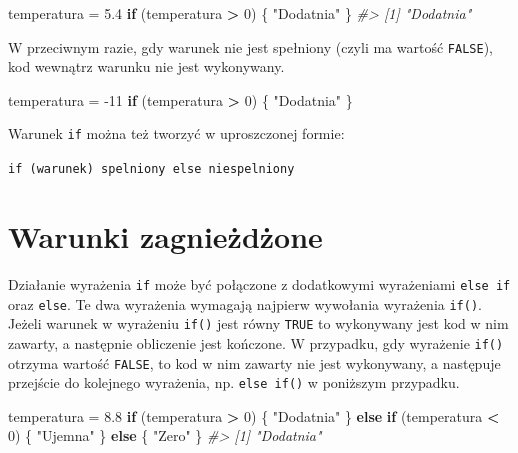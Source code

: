 \documentclass[paper=6in:9in,pagesize=pdftex,headinclude=on,footinclude=on,10pt]{scrbook}
\newenvironment{Shaded}{\begin{snugshade}}{\end{snugshade}}
\newcommand{\CommentTok}[1]{\textcolor[rgb]{0.56,0.35,0.01}{\textit{#1}}}
\newcommand{\ControlFlowTok}[1]{\textcolor[rgb]{0.13,0.29,0.53}{\textbf{#1}}}
\newcommand{\DecValTok}[1]{\textcolor[rgb]{0.00,0.00,0.81}{#1}}
\newcommand{\FloatTok}[1]{\textcolor[rgb]{0.00,0.00,0.81}{#1}}
\newcommand{\NormalTok}[1]{#1}
\newcommand{\OperatorTok}[1]{\textcolor[rgb]{0.81,0.36,0.00}{\textbf{#1}}}
\newcommand{\StringTok}[1]{\textcolor[rgb]{0.31,0.60,0.02}{#1}}
\let\BeginKnitrBlock\begin \let\EndKnitrBlock\end
\begin{document}
\begin{Shaded}
\begin{Highlighting}[]
\NormalTok{temperatura =}\StringTok{ }\FloatTok{5.4}
\ControlFlowTok{if}\NormalTok{ (temperatura }\OperatorTok{>}\StringTok{ }\DecValTok{0}\NormalTok{) \{}
  \StringTok{"Dodatnia"}
\NormalTok{\}}
\CommentTok{#> [1] "Dodatnia"}
\end{Highlighting}
\end{Shaded}

W przeciwnym razie, gdy warunek nie jest spełniony (czyli ma wartość \texttt{FALSE}), kod wewnątrz warunku nie jest wykonywany.

\begin{Shaded}
\begin{Highlighting}[]
\NormalTok{temperatura =}\StringTok{ }\DecValTok{-11}
\ControlFlowTok{if}\NormalTok{ (temperatura }\OperatorTok{>}\StringTok{ }\DecValTok{0}\NormalTok{) \{}
  \StringTok{"Dodatnia"}
\NormalTok{\}}
\end{Highlighting}
\end{Shaded}

\BeginKnitrBlock{rmdinfo}
Warunek \texttt{if} można też tworzyć w uproszczonej formie:

\texttt{if\ (warunek)\ spelniony\ else\ niespelniony}
\EndKnitrBlock{rmdinfo}

\hypertarget{warunki-zagnieux17cdux17cone}{%
\section{Warunki zagnieżdżone}\label{warunki-zagnieux17cdux17cone}}

Działanie wyrażenia \texttt{if} może być połączone z dodatkowymi wyrażeniami \texttt{else\ if} oraz \texttt{else}.
Te dwa wyrażenia wymagają najpierw wywołania wyrażenia \texttt{if()}.
Jeżeli warunek w wyrażeniu \texttt{if()} jest równy \texttt{TRUE} to wykonywany jest kod w nim zawarty, a następnie obliczenie jest kończone.
W przypadku, gdy wyrażenie \texttt{if()} otrzyma wartość \texttt{FALSE}, to kod w nim zawarty nie jest wykonywany, a następuje przejście do kolejnego wyrażenia, np. \texttt{else\ if()} w poniższym przypadku.

\begin{Shaded}
\begin{Highlighting}[]
\NormalTok{temperatura =}\StringTok{ }\FloatTok{8.8}
\ControlFlowTok{if}\NormalTok{ (temperatura }\OperatorTok{>}\StringTok{ }\DecValTok{0}\NormalTok{) \{}
  \StringTok{"Dodatnia"}
\NormalTok{\} }\ControlFlowTok{else} \ControlFlowTok{if}\NormalTok{ (temperatura }\OperatorTok{<}\StringTok{ }\DecValTok{0}\NormalTok{) \{}
  \StringTok{"Ujemna"}
\NormalTok{\} }\ControlFlowTok{else}\NormalTok{ \{}
  \StringTok{"Zero"}
\NormalTok{\}}
\CommentTok{#> [1] "Dodatnia"}
\end{Highlighting}
\end{Shaded}
\end{document}
